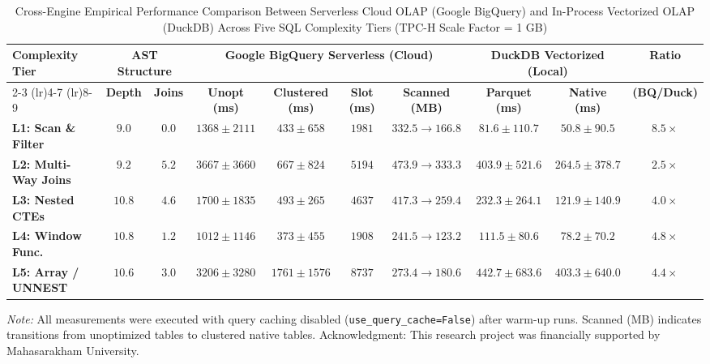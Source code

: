 \begin{table}[t!]
\centering
\begin{threeparttable}
\caption{Cross-Engine Empirical Performance Comparison Between Serverless Cloud OLAP (Google BigQuery) and In-Process Vectorized OLAP (DuckDB) Across Five SQL Complexity Tiers (TPC-H Scale Factor = 1 GB)}
\label{tab:cross_engine_main}
\setlength{\tabcolsep}{5.2pt}
\renewcommand{\arraystretch}{1.18}
\begin{tabular}{@{}lccccccccc@{}}
\toprule
\multirow{2}{*}{\textbf{Complexity Tier}} & \multicolumn{2}{c}{\textbf{AST Structure}} & \multicolumn{4}{c}{\textbf{Google BigQuery Serverless (Cloud)}} & \multicolumn{2}{c}{\textbf{DuckDB Vectorized (Local)}} & \multirow{2}{*}{\textbf{Ratio}} \\
\cmidrule(lr){2-3} \cmidrule(lr){4-7} \cmidrule(lr){8-9}
 & \textbf{Depth} & \textbf{Joins} & \textbf{Unopt (ms)} & \textbf{Clustered (ms)} & \textbf{Slot (ms)} & \textbf{Scanned (MB)} & \textbf{Parquet (ms)} & \textbf{Native (ms)} & \textbf{(BQ/Duck)} \\
\midrule
\textbf{L1: Scan \& Filter} & $9.0$ & $0.0$ & $1368 \pm 2111$ & $433 \pm 658$ & $1981$ & $332.5 \rightarrow 166.8$ & $81.6 \pm 110.7$ & $\mathbf{50.8 \pm 90.5}$ & $8.5\times$ \\
\textbf{L2: Multi-Way Joins} & $9.2$ & $5.2$ & $3667 \pm 3660$ & $667 \pm 824$ & $5194$ & $473.9 \rightarrow 333.3$ & $403.9 \pm 521.6$ & $\mathbf{264.5 \pm 378.7}$ & $2.5\times$ \\
\textbf{L3: Nested CTEs} & $10.8$ & $4.6$ & $1700 \pm 1835$ & $493 \pm 265$ & $4637$ & $417.3 \rightarrow 259.4$ & $232.3 \pm 264.1$ & $\mathbf{121.9 \pm 140.9}$ & $4.0\times$ \\
\textbf{L4: Window Func.} & $10.8$ & $1.2$ & $1012 \pm 1146$ & $373 \pm 455$ & $1908$ & $241.5 \rightarrow 123.2$ & $111.5 \pm 80.6$ & $\mathbf{78.2 \pm 70.2}$ & $4.8\times$ \\
\textbf{L5: Array / UNNEST} & $10.6$ & $3.0$ & $3206 \pm 3280$ & $1761 \pm 1576$ & $8737$ & $273.4 \rightarrow 180.6$ & $442.7 \pm 683.6$ & $\mathbf{403.3 \pm 640.0}$ & $4.4\times$ \\
\bottomrule
\end{tabular}
\begin{tablenotes}\footnotesize
\item \textit{Note:} All measurements were executed with query caching disabled (\texttt{use\_query\_cache=False}) after warm-up runs. Scanned (MB) indicates transitions from unoptimized tables to clustered native tables. Acknowledgment: This research project was financially supported by Mahasarakham University.
\end{tablenotes}
\end{threeparttable}
\end{table}
